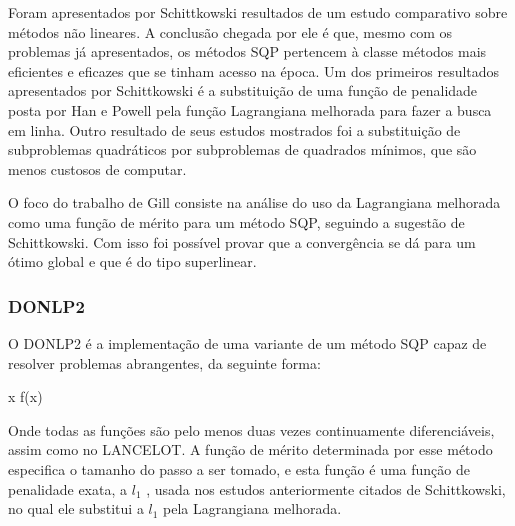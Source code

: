 Foram apresentados por Schittkowski \cite{schittkowski1982nonlinear} resultados de um estudo
comparativo sobre métodos não lineares. A conclusão chegada por ele é que, mesmo com os problemas
já apresentados, os métodos SQP pertencem à classe métodos mais eficientes e eficazes que se tinham
acesso na época. Um dos primeiros resultados apresentados por Schittkowski é a substituição de uma
função de penalidade posta por Han e Powell pela função Lagrangiana melhorada para fazer a busca em linha.
Outro resultado de seus estudos mostrados foi a substituição de subproblemas quadráticos por
subproblemas de quadrados mínimos, que são menos custosos de computar.

O foco do trabalho de Gill \cite{gill1986some} consiste na análise do uso da Lagrangiana melhorada
como uma função de mérito para um método SQP, seguindo a sugestão de Schittkowski. Com isso foi
possível provar que a convergência se dá para um ótimo global e que é do tipo superlinear.



\subsubsection{DONLP2}
\label{sec_dosnlp2}
O DONLP2 é a implementação de uma variante de um método SQP capaz de resolver problemas 
abrangentes, da seguinte forma:

\vspace{-15pt}
\begin{mini!}
{x}{ f(x) \label{donl2_obj}}{\label{prob_donlp2}}{}
\end{mini!}

Onde todas as funções são pelo menos duas vezes continuamente diferenciáveis, assim como no
LANCELOT. A função de mérito determinada por esse método especifica o tamanho do passo a ser tomado,
e esta função é uma função de penalidade exata, a \( l_1 \) \cite{han1979exact}, usada nos estudos
anteriormente citados de Schittkowski, no qual ele substitui a \(l_1\) pela Lagrangiana melhorada.